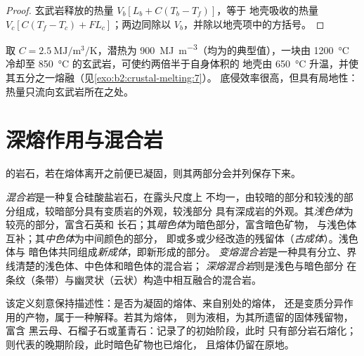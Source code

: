 \begin{proof}
玄武岩释放的热量 $V_b[L_b + C(T_b - T_f)]$，等于
地壳吸收的热量 $V_c[C(T_f - T_c) + F L_c]$；两边同除以 $V_b$，并除以地壳项中的方括号。
\end{proof}

取 $C = \qty{2.5}{\mega\joule\per\cubic\metre\per\kelvin}$，潜热为
\qty{900}{\mega\joule\per\cubic\metre}（均为的典型值），一块由
\qty{1200}{\celsius} 冷却至 \qty{850}{\celsius} 的玄武岩，可使约两倍半于自身体积的
地壳由 \qty{650}{\celsius} 升温，并使其五分之一熔融（见\cref{exo:b2:crustal-melting:7}）。
底侵效率很高，但具有局地性：热量只流向玄武岩所在之处。

\section{深熔作用与混合岩}\label{sec:b2:crustal-melting:migmatites}

的岩石，若在熔体离开之前便已凝固，则其两部分会并列保存下来。

\begin{definition}[混合岩及其组成部分]\label{def:b2:crustal-melting:migmatite}
\emph{混合岩}是一种复合硅酸盐岩石，在露头尺度上
不均一，由较暗的部分和较浅的部分组成，较暗部分具有变质岩的外观，较浅部分
具有深成岩的外观。其\emph{浅色体}为较亮的部分，富含石英和
长石；其\emph{暗色体}为暗色部分，富含暗色矿物，
与浅色体互补；其\emph{中色体}为中间颜色的部分，
即或多或少经改造的残留体（\emph{古成体}）。浅色体与
暗色体共同组成\emph{新成体}，即新形成的部分。
\emph{变熔混合岩}是一种具有分立、界线清楚的浅色体、中色体和暗色体的混合岩；
\emph{深熔混合岩}则是浅色与暗色部分
在条纹（条带）与幽灵状（云状）构造中相互融合的混合岩。
\end{definition}

该定义刻意保持描述性：是否为凝固的熔体、来自别处的熔体，
还是变质分异作用的产物，属于一种解释。若其为熔体，
则为液相，为其所遗留的固体残留物，富含
黑云母、石榴子石或堇青石：记录了的初始阶段，此时
只有部分岩石熔化；则代表的晚期阶段，此时暗色矿物也已熔化，
且熔体仍留在原地。

